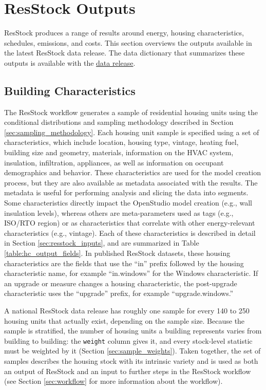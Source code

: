 \chapter{ResStock Outputs}\label{sec:resstock_outputs}
ResStock produces a range of results around energy, housing characteristics, schedules, emissions, and costs. This section overviews the outputs available in the latest ResStock data release. The data dictionary that summarizes these outputs is available with the \href{https://oedi-data-lake.s3.amazonaws.com/nrel-pds-building-stock/end-use-load-profiles-for-us-building-stock/2025/resstock_amy2018_release_1/data_dictionary.tsv}{data release}.

\section{Building Characteristics}
The ResStock workflow generates a sample of residential housing units using the conditional distributions and sampling methodology described in Section \ref{sec:sampling_methodology}. Each housing unit sample is specified using a set of characteristics, which include location, housing type, vintage,  heating fuel, building size and geometry, materials, information on the HVAC system, insulation, infiltration, appliances, as well as information on occupant demographics and  behavior. These characteristics are used for the model creation process, but they are also available as metadata associated with the results. The metadata is useful for performing analysis and slicing the data into segments. Some characteristics directly impact the OpenStudio model creation (e.g., wall insulation levels), whereas others are meta-parameters used as tags (e.g., ISO/RTO region) or as characteristics that correlate with other energy-relevant characteristics (e.g., vintage). Each of these characteristics is described in detail in Section \ref{sec:resstock_inputs}, and are summarized in Table \ref{table:hc_output_fields}. In published ResStock datasets, these housing characteristics are the fields that use the ``in'' prefix followed by the housing characteristic name, for example ``in.windows'' for the Windows characteristic. If an upgrade or measure changes a housing characteristic, the post-upgrade characteristic uses the ``upgrade'' prefix, for example ``upgrade.windows.''

A national ResStock data release has roughly one sample for every 140 to 250 housing units that actually exist, depending on the sample size. Because the sample is stratified, the number of housing units a building represents varies from building to building: the \texttt{weight} column gives it, and every stock-level statistic must be weighted by it (Section \ref{sec:sample_weights}). Taken together, the set of samples describes the housing stock with its intrinsic variety and is used as both an output of ResStock and an input to further steps in the ResStock workflow (see Section \ref{sec:workflow} for more information about the workflow).

